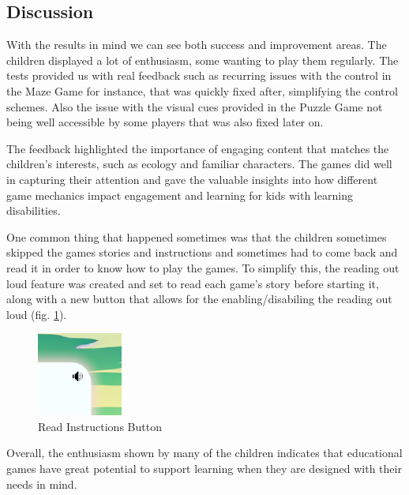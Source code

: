 \newpage
\subsection{Discussion}

With the results in mind we can see both success and improvement areas. The children displayed a lot of enthusiasm, some wanting to play them regularly. The tests provided us with real feedback such as recurring issues with the control in the Maze Game for instance, that was quickly fixed after, simplifying the control schemes. Also the issue with the visual cues provided in the Puzzle Game not being well accessible by some players that was also fixed later on.


The feedback highlighted the importance of engaging content that matches the children’s interests, such as ecology and familiar characters. The games did well in capturing their attention and gave the valuable insights into how different game mechanics impact engagement and learning for kids with learning disabilities.

One common thing that happened sometimes was that the children sometimes skipped the games stories and instructions and sometimes had to come back and read it in order to know how to play the games. To simplify this, the reading out loud feature was created and set to read each game's story before starting it, along with a new button that allows for the enabling/disabiling the reading out loud (fig. \ref{fig:readInstructionsButton}).

\begin{figure}[!h]
    \centering
    \includegraphics[width=0.1\linewidth]{Chapters/game_changes/read-sound-icon.png}
    \caption{Read Instructions Button}
    \label{fig:readInstructionsButton}
\end{figure}

Overall, the enthusiasm shown by many of the children indicates that educational games have great potential to support learning when they are designed with their needs in mind.

